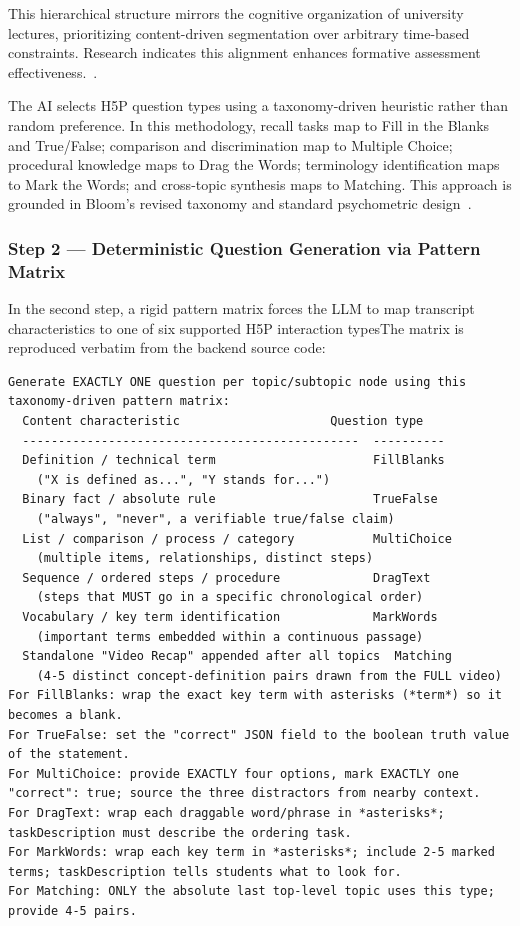 This hierarchical structure mirrors the cognitive organization of university lectures, prioritizing content-driven segmentation over arbitrary time-based constraints. Research indicates this alignment enhances formative assessment effectiveness.~\cite{anderson2001}.

The AI selects H5P question types using a taxonomy-driven heuristic rather than random preference. In this methodology, recall tasks map to Fill in the Blanks and True/False; comparison and discrimination map to Multiple Choice; procedural knowledge maps to Drag the Words; terminology identification maps to Mark the Words; and cross-topic synthesis maps to Matching. This approach is grounded in Bloom’s revised taxonomy and standard psychometric design~\cite{bloom1956,anderson2001,white2023}.
\subsubsection{Step 2 --- Deterministic Question Generation via Pattern Matrix}
In the second step, a rigid pattern matrix forces the LLM to map transcript characteristics to one of six supported H5P interaction typesThe matrix is reproduced verbatim from the backend source code:
\begin{lstlisting}[language={},caption={Strict pattern matrix provided in the AI system prompt (Step 2)}]
Generate EXACTLY ONE question per topic/subtopic node using this taxonomy-driven pattern matrix:
  Content characteristic                     Question type
  -----------------------------------------------  ----------
  Definition / technical term                      FillBlanks
    ("X is defined as...", "Y stands for...")
  Binary fact / absolute rule                      TrueFalse
    ("always", "never", a verifiable true/false claim)
  List / comparison / process / category           MultiChoice
    (multiple items, relationships, distinct steps)
  Sequence / ordered steps / procedure             DragText
    (steps that MUST go in a specific chronological order)
  Vocabulary / key term identification             MarkWords
    (important terms embedded within a continuous passage)
  Standalone "Video Recap" appended after all topics  Matching
    (4-5 distinct concept-definition pairs drawn from the FULL video)
For FillBlanks: wrap the exact key term with asterisks (*term*) so it becomes a blank.
For TrueFalse: set the "correct" JSON field to the boolean truth value of the statement.
For MultiChoice: provide EXACTLY four options, mark EXACTLY one "correct": true; source the three distractors from nearby context.
For DragText: wrap each draggable word/phrase in *asterisks*; taskDescription must describe the ordering task.
For MarkWords: wrap each key term in *asterisks*; include 2-5 marked terms; taskDescription tells students what to look for.
For Matching: ONLY the absolute last top-level topic uses this type; provide 4-5 pairs.
\end{lstlisting}

